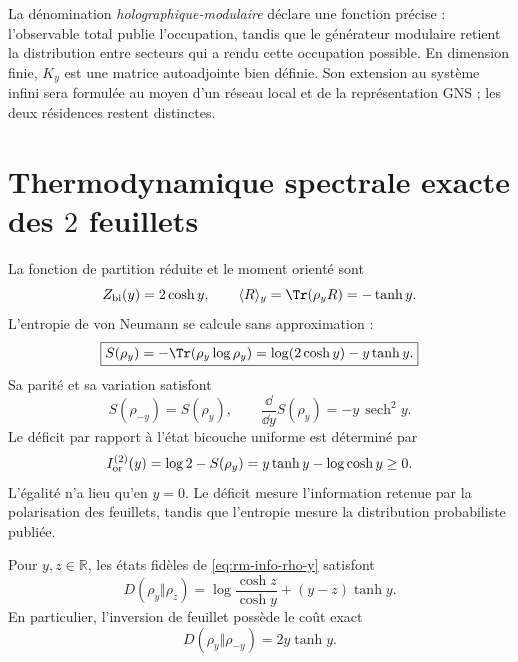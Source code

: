 La dénomination \emph{holographique-modulaire} déclare une fonction précise :
l'observable total publie l'occupation, tandis que le générateur modulaire
retient la distribution entre secteurs qui a rendu cette occupation possible. En
dimension finie, \(K_y\) est une matrice autoadjointe bien définie. Son
extension au système infini sera formulée au moyen d'un réseau local et de la
représentation GNS ; les deux résidences restent distinctes.

\section{Thermodynamique spectrale exacte des \(2\) feuillets}

La fonction de partition réduite et le moment orienté sont
\begin{equation}
 Z_{\rm bi}(y)=2\cosh y,
 \qquad
 \langle R\rangle_y=\Tr(\rho_yR)=-\tanh y.
 \label{eq:rm-info-particion-momento}
\end{equation}
L'entropie de von Neumann se calcule sans approximation :
\begin{equation}
 \boxed{
 S(\rho_y)
 =-\Tr(\rho_y\log\rho_y)
 =\log(2\cosh y)-y\tanh y.}
 \label{eq:rm-info-entropia-bicapa}
\end{equation}
Sa parité et sa variation satisfont
\begin{equation}
 S(\rho_{-y})=S(\rho_y),
 \qquad
 \frac{\dd}{\dd y}S(\rho_y)=-y\,\operatorname{sech}^2y.
 \label{eq:rm-info-paridad-entropia}
\end{equation}
Le déficit par rapport à l'état bicouche uniforme est déterminé par
\begin{equation}
 I_{\rm or}^{(2)}(y)
 =\log2-S(\rho_y)
 =y\tanh y-\log\cosh y
 \geq0.
 \label{eq:rm-info-deficit-orientado}
\end{equation}
L'égalité n'a lieu qu'en \(y=0\). Le déficit mesure l'information
retenue par la polarisation des feuillets, tandis que l'entropie mesure la
distribution probabiliste publiée.

\begin{theorem}
\label{thm:rm-info-relative-general}
Pour \(y,z\in\mathbb R\), les états fidèles de
\cref{eq:rm-info-rho-y} satisfont
\begin{equation}
 \boxed{
 D(\rho_y\Vert\rho_z)
 =\log\frac{\cosh z}{\cosh y}
 +(y-z)\tanh y.}
 \label{eq:rm-info-relative-general}
\end{equation}
En particulier, l'inversion de feuillet possède le coût exact
\begin{equation}
 \boxed{
 D(\rho_y\Vert\rho_{-y})=2y\tanh y.}
 \label{eq:rm-info-relative-inversion}
\end{equation}
\end{theorem}


